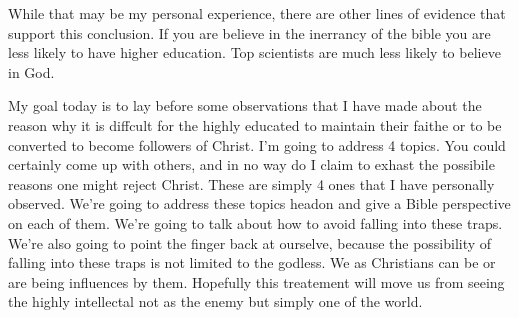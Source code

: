 \documentclass{tufte-handout}
\begin{document}
While that may be my personal experience, there are other lines of evidence that support this conclusion.  
If you are believe in the inerrancy of the bible you are less likely to have higher education.
Top scientists are much less likely to believe in God.

My goal today is to lay before some observations that I have made about the reason why it is diffcult for the highly educated to maintain their faithe or to be converted to become followers of Christ.  I'm going to address 4 topics.  You could certainly come up with others, and in no way do I claim to exhast the possibile reasons one might reject Christ.  These are simply 4 ones that I have personally observed.  We're going to address these topics headon and give a Bible perspective on each of them.  We're going to talk about how to avoid falling into these traps.  We're also going to point the finger back at ourselve, because the possibility of falling into these traps is not limited to the godless.  We as Christians can be or are being influences by them.  Hopefully this treatement will move us from seeing the highly intellectal not as the enemy but simply one of the world. 
\end{document}
